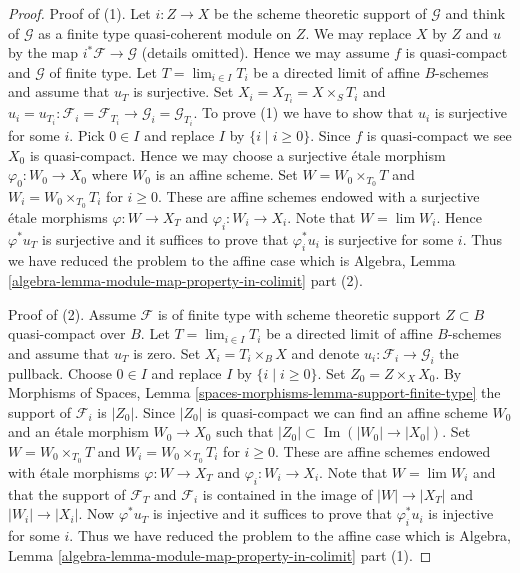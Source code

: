 \documentclass{stacks-project}
\theoremstyle{plain}
\theoremstyle{definition}
\theoremstyle{remark}
\numberwithin{equation}{subsection}
\def\lim{\mathop{\mathrm{lim}}\nolimits}
\def\Im{\mathop{\mathrm{Im}}}
\begin{document}
\begin{proof}
Proof of (1). Let $i : Z \to X$ be the scheme theoretic support of
$\mathcal{G}$ and think of $\mathcal{G}$ as a finite type quasi-coherent
module on $Z$. We may replace $X$ by $Z$ and $u$ by the map
$i^*\mathcal{F} \to \mathcal{G}$ (details omitted). Hence we may assume
$f$ is quasi-compact and $\mathcal{G}$ of finite type.
Let $T = \lim_{i \in I} T_i$ be a directed limit of affine $B$-schemes
and assume that $u_T$ is surjective.
Set $X_i = X_{T_i} = X \times_S T_i$ and
$u_i = u_{T_i} : \mathcal{F}_i = \mathcal{F}_{T_i}
\to \mathcal{G}_i = \mathcal{G}_{T_i}$.
To prove (1) we have to show that $u_i$ is surjective for some $i$.
Pick $0 \in I$ and replace $I$ by $\{i \mid i \geq 0\}$.
Since $f$ is quasi-compact we see $X_0$ is quasi-compact.
Hence we may choose a surjective \'etale morphism $\varphi_0 : W_0 \to X_0$
where $W_0$ is an affine scheme. Set $W = W_0 \times_{T_0} T$
and $W_i = W_0 \times_{T_0} T_i$ for $i \geq 0$.  These
are affine schemes endowed
with a surjective \'etale morphisms $\varphi : W \to X_T$ and
$\varphi_i : W_i \to X_i$. Note that $W = \lim W_i$.
Hence $\varphi^*u_T$ is surjective and it suffices to prove that
$\varphi_i^*u_i$ is surjective for some $i$. Thus we have reduced
the problem to the affine case which is
Algebra, Lemma \ref{algebra-lemma-module-map-property-in-colimit} part (2).

\medskip\noindent
Proof of (2). Assume $\mathcal{F}$ is of finite type with scheme theoretic
support $Z \subset B$ quasi-compact over $B$. Let $T = \lim_{i \in I} T_i$
be a directed limit of affine $B$-schemes and assume that $u_T$ is zero.
Set $X_i = T_i \times_B X$ and denote $u_i : \mathcal{F}_i \to \mathcal{G}_i$
the pullback. Choose $0 \in I$ and replace $I$ by
$\{i \mid i \geq 0\}$. Set $Z_0 = Z \times_X X_0$. By
Morphisms of Spaces, Lemma \ref{spaces-morphisms-lemma-support-finite-type}
the support of $\mathcal{F}_i$ is $|Z_0|$. Since $|Z_0|$ is quasi-compact
we can find an affine scheme $W_0$ and an \'etale morphism $W_0 \to X_0$
such that $|Z_0| \subset \Im(|W_0| \to |X_0|)$.
Set $W = W_0 \times_{T_0} T$ and $W_i = W_0 \times_{T_0} T_i$ for $i \geq 0$.
These are affine schemes endowed
with \'etale morphisms $\varphi : W \to X_T$ and
$\varphi_i : W_i \to X_i$. Note that $W = \lim W_i$
and that the support of $\mathcal{F}_T$ and $\mathcal{F}_i$
is contained in the image of $|W| \to |X_T|$ and $|W_i| \to |X_i|$.
Now $\varphi^*u_T$ is injective and it suffices to prove that
$\varphi_i^*u_i$ is injective for some $i$.
Thus we have reduced the problem to the affine case which is
Algebra, Lemma \ref{algebra-lemma-module-map-property-in-colimit} part (1).


\end{proof}
\end{document}
